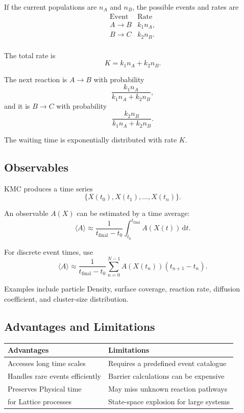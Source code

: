 \documentclass[a4paper, 10pt, onepage]{elegantbook}
\begin{document}
{If the current populations are \(n_A\) and \(n_B\), the possible events and
rates are
\[
\begin{array}{ll}
\text{Event} & \text{Rate} \\
A\to B & k_1n_A, \\
B\to C & k_2n_B. \\
\end{array}
\]

The total rate is
\[
K=k_1n_A+k_2n_B.
\]

The next reaction is \(A\to B\) with probability
\[
\frac{k_1n_A}{k_1n_A+k_2n_B},
\]
and it is \(B\to C\) with probability
\[
\frac{k_2n_B}{k_1n_A+k_2n_B}.
\]

The waiting time is exponentially distributed with rate \(K\).

\subsection{Observables}

KMC produces a time series
\[
\{X(t_0),X(t_1),\ldots,X(t_n)\}.
\]

An observable \(A(X)\) can be estimated by a time average:
\[
\langle A\rangle
\approx
\frac{1}{t_{\mathrm{final}}-t_0}
\int_{t_0}^{t_{\mathrm{final}}}A(X(t))\,\mathrm dt.
\]

For discrete event times, use
\[
\langle A\rangle
\approx
\frac{1}{t_{\mathrm{final}}-t_0}
\sum_{n=0}^{N-1}
A(X(t_n))(t_{n+1}-t_n).
\]

Examples include particle Density, surface coverage, reaction rate, diffusion
coefficient, and cluster-size distribution.

\subsection{Advantages and Limitations}

\begin{center}
\begin{tabular}{ll}
\hline
Advantages & Limitations \\
\hline
Accesses long time scales & Requires a predefined event catalogue \\
Handles rare events efficiently & Barrier calculations can be expensive \\
Preserves Physical time & May miss unknown reaction pathways \\
 for Lattice processes & State-space explosion for large systems \\
\hline
\end{tabular}
\end{center}

}
\end{document}
